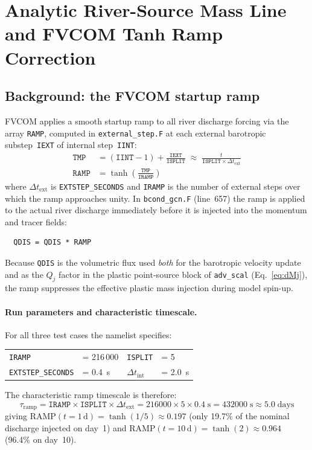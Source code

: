 \documentclass[11pt]{article}
\begin{document}
\section*{Analytic River-Source Mass Line and FVCOM Tanh Ramp Correction}
\label{sec:ramp}

\subsection*{Background: the FVCOM startup ramp}

FVCOM applies a smooth startup ramp to all river discharge forcing via the
array \texttt{RAMP}, computed in \texttt{external\_step.F} at each external
barotropic substep~\texttt{IEXT} of internal step~\texttt{IINT}:
\begin{align}
  \texttt{TMP} &= (\texttt{IINT}-1) + \frac{\texttt{IEXT}}{\texttt{ISPLIT}}
                \;\approx\;\frac{t}{\texttt{ISPLIT}\times\Delta t_{\text{ext}}}
  \label{eq:tmp}\\
  \texttt{RAMP} &= \tanh\!\left(\frac{\texttt{TMP}}{\texttt{IRAMP}}\right)
  \label{eq:ramp}
\end{align}
where $\Delta t_{\text{ext}}$ is \texttt{EXTSTEP\_SECONDS} and \texttt{IRAMP}
is the number of external steps over which the ramp approaches unity.
In \texttt{bcond\_gcn.F} (line~657) the ramp is applied to the actual river
discharge immediately before it is injected into the momentum and tracer fields:
\begin{verbatim}
  QDIS = QDIS * RAMP
\end{verbatim}
Because \texttt{QDIS} is the volumetric flux used \emph{both} for the
barotropic velocity update and as the $Q_j$ factor in the plastic point-source
block of \texttt{adv\_scal} (Eq.~\ref{eq:dMj}), the ramp suppresses the
effective plastic mass injection during model spin-up.

\paragraph{Run parameters and characteristic timescale.}
For all three test cases the namelist specifies:
\begin{center}
\begin{tabular}{llll}
\texttt{IRAMP} & = 216\,000 & \texttt{ISPLIT} & = 5\\
\texttt{EXTSTEP\_SECONDS} & = 0.4~s & $\Delta t_{\text{int}}$ & = 2.0~s
\end{tabular}
\end{center}
The characteristic ramp timescale is therefore:
\[
  \tau_{\text{ramp}} = \texttt{IRAMP}\times\texttt{ISPLIT}\times\Delta t_{\text{ext}}
                     = 216000 \times 5 \times 0.4\;\text{s}
                     = 432000\;\text{s} \approx 5.0\;\text{days}
\]
giving $\text{RAMP}(t=1\,\text{d}) = \tanh(1/5) \approx 0.197$ (only 19.7\%
of the nominal discharge injected on day~1) and
$\text{RAMP}(t=10\,\text{d}) = \tanh(2) \approx 0.964$ (96.4\% on day~10).
\end{document}

